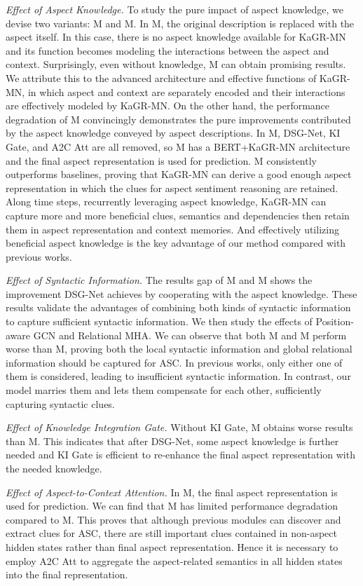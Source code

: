 \textit{Effect of Aspect Knowledge.}
To study the pure impact of aspect knowledge, we devise two variants: M and M. 
In M, the original description is replaced with the aspect itself.
In this case, there is no aspect knowledge available for KaGR-MN and its function becomes modeling the interactions between the aspect and context.
Surprisingly, even without knowledge, M can obtain promising results. 
We attribute this to the advanced architecture and effective functions of KaGR-MN, in which aspect and context are separately encoded and their interactions are effectively modeled by KaGR-MN.
On the other hand, the performance degradation of M convincingly demonstrates the pure improvements contributed by the aspect knowledge conveyed by aspect descriptions.
In M, DSG-Net, KI Gate, and A2C Att are all removed, so M has a BERT+KaGR-MN architecture and the final aspect representation is used for prediction.
M consistently outperforms baselines, proving that KaGR-MN can derive a good enough aspect representation in which the clues for aspect sentiment reasoning are retained.
Along time steps, recurrently leveraging aspect knowledge, KaGR-MN can capture more and more beneficial clues, semantics and dependencies then retain them in aspect representation and context memories.
And effectively utilizing beneficial aspect knowledge is the key advantage of our method compared with previous works.

\textit{Effect of Syntactic Information.}
The results gap of M and M shows the improvement DSG-Net achieves by cooperating with the aspect knowledge.
These results validate the advantages of combining both kinds of syntactic information to capture sufficient syntactic information.
We then study the effects of Position-aware GCN and Relational MHA.
We can observe that both M and M perform worse than M, proving both the local syntactic information and global relational information should be captured for ASC.
In previous works, only either one of them is considered, leading to insufficient syntactic information.
In contrast, our model marries them and lets them compensate for each other, sufficiently capturing syntactic clues.




\textit{Effect of Knowledge Integration Gate.}
Without KI Gate, M obtains worse results than M.
This indicates that after DSG-Net, some aspect knowledge is further needed and KI Gate is efficient to re-enhance the final aspect representation with the needed knowledge.

\textit{Effect of Aspect-to-Context Attention.}
In M, the final aspect representation is used for prediction.
We can find that M has limited performance degradation compared to M.
This proves that although previous modules can discover and extract clues for ASC, there are still important clues contained in non-aspect hidden states rather than final aspect representation.
Hence it is necessary to employ A2C Att to aggregate the aspect-related semantics in all hidden states into the final representation.

